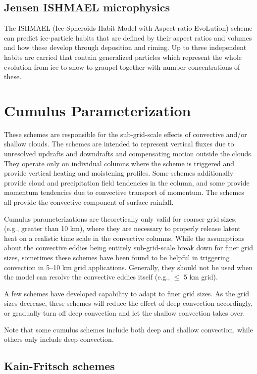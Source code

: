\subsection {Jensen ISHMAEL microphysics}
The ISHMAEL (Ice-Spheroids Habit Model with Aspect-ratio EvoLution) scheme \citep{jensen17} can predict ice-particle habits
that are defined by their aspect ratios and volumes and how these develop through deposition and riming. Up to three independent
habits are carried that contain generalized particles which represent the whole evolution from ice to snow to graupel together with
number concentrations of these.


\section{Cumulus Parameterization}

These schemes are responsible for the sub-grid-scale effects of 
convective and/or shallow clouds. The schemes are intended to 
represent vertical fluxes due to unresolved updrafts and 
downdrafts and compensating motion outside the clouds. They 
operate only on individual columns where the scheme is triggered and 
provide vertical heating and moistening profiles. Some schemes 
additionally provide cloud and precipitation field tendencies 
in the column, and some provide momentum tendencies 
due to convective transport of momentum. The schemes all provide 
the convective component of surface rainfall.

Cumulus parameterizations are theoretically only valid for coarser grid sizes,
(e.g., greater than 10 km), where they are necessary to properly
release latent heat on a realistic time scale in the convective columns.
While the assumptions about the convective eddies being entirely
sub-grid-scale break down for finer grid sizes, sometimes these
schemes have been found to be helpful in triggering convection in
5--10 km grid applications. Generally, they should not be used when
the model can resolve the convective eddies itself (e.g., $\le$ 5 km grid).

A few schemes have developed capability to adapt to finer grid sizes. As the grid sizes
decrease, these schemes will reduce the effect of deep convection accordingly, or gradually turn
off deep convection and let the shallow convection takes over.

Note that some cumulus schemes include both deep and shallow
convection, while others only include deep convection.
  
\subsection{Kain-Fritsch schemes}


